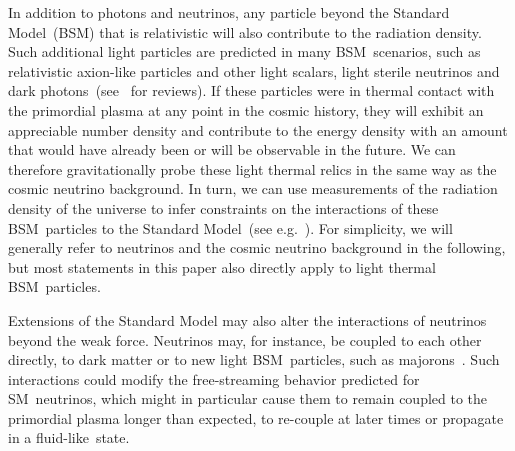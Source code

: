 \documentclass[11pt]{article}
\numberwithin{equation}{section}
\begin{document}
In addition to photons and neutrinos, any particle beyond the Standard Model~(BSM) that is relativistic will also contribute to the radiation density. Such additional light particles are predicted in many BSM~scenarios, such as relativistic axion-like particles and other light scalars, light sterile neutrinos and dark photons~(see~\cite{Abazajian:2012ys, Marsh:2015xka, Hook:2018dlk, Green:2019glg, Allahverdi:2020bys, Asadi:2022njl, Dvorkin:2022jyg, Antel:2023hkf} for reviews). If these particles were in thermal contact with the primordial plasma at any point in the cosmic history, they will exhibit an appreciable number density and contribute to the energy density with an amount that would have already been or will be observable in the future. We can therefore gravitationally probe these light thermal relics in the same way as the cosmic neutrino background. In turn, we can use measurements of the radiation density of the universe to infer constraints on the interactions of these BSM~particles to the Standard Model~(see e.g.~\cite{Brust:2013ova, Chacko:2015noa, Baumann:2016wac, Ferreira:2018vjj, DEramo:2018vss, Arias-Aragon:2020shv, Ghosh:2020vti, Ferreira:2020bpb, Dror:2021nyr, Green:2021hjh, DEramo:2021usm, Caloni:2022uya, Bianchini:2023ubu, DEramo:2023nzt, Badziak:2024szg, Badziak:2024qjg, DEramo:2024jhn}). For simplicity, we will generally refer to neutrinos and the cosmic neutrino background in the following, but most statements in this paper also directly apply to light thermal BSM~particles.\medskip

Extensions of the Standard Model may also alter the interactions of neutrinos beyond the weak force. Neutrinos may, for instance, be coupled to each other directly, to dark matter or to new light BSM~particles, such as majorons~\cite{Berryman:2022hds}. Such interactions could modify the free-streaming behavior predicted for SM~neutrinos, which might in particular cause them to remain coupled to the primordial plasma longer than expected, to re-couple at later times or propagate in a fluid-like~state.\medskip
\end{document}
